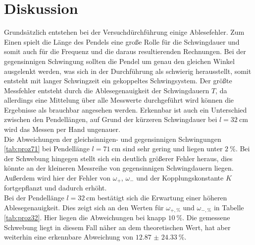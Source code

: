 \section{Diskussion}

Grundsätzlich entstehen bei der Versuchdürchführung einige Ablesefehler. Zum Einen spielt die Länge des Pendels eine große Rolle für die Schwingdauer und somit auch für die Frequenz und die daraus resultierenden Rechnungen. 
Bei der gegensinnigen Schwingung sollten die Pendel um genau den gleichen Winkel ausgelenkt werden, was sich in der Durchführung als schwierig herausstellt, somit entsteht mit langer Schwingzeit ein gekoppeltes Schwingsystem.
Der größte Messfehler entsteht durch die Ablesegenauigkeit der Schwingdauern $T$, da allerdings eine Mittelung über alle Messwerte durchgeführt wird können die Ergebnisse als brauchbar angesehen werden.
Erkennbar ist auch ein Unterschied zwischen den Pendellängen, auf Grund der kürzeren Schwingdauer bei $l = \SI{32}{\centi\meter}$ wird das Messen per Hand ungenauer.
\\
\newline
Die Abweichungen der gleichsinnigen- und gegensinnigen Schwingungen \ref{tab:proz71} bei Pendellänge $l = \SI{71}{\centi\meter}$ sind sehr gering und liegen unter $\SI{2}{\percent}$. Bei der Schwebung hingegen stellt sich ein deutlich größerer
Fehler heraus, dies könnte an der kleineren Messreihe von gegensinnigen Schwingdauern liegen. Außerdem wird hier der Fehler von $\omega_{+}$, $\omega_{-}$ und der Kopplungskonstante $K$ fortgepflanzt und dadurch erhöht.
\\
\newline
Bei der Pendellänge $l = \SI{32}{\centi\meter}$ bestätigt sich die Erwartung einer höheren Ablesegenauigkeit. Dies zeigt sich an den Werten für $\omega_{+{,}\si{\percent}}$ und $\omega_{-{,}\si{\percent}}$ in Tabelle \ref{tab:proz32}. Hier liegen
die Abweichungen bei knapp $\SI{10}{\percent}$. Die gemessene Schwebung liegt in diesem Fall näher an dem theoretischen Wert, hat aber weiterhin eine erkennbare Abweichung von $\SI{12.87(2433)}{\percent}$.